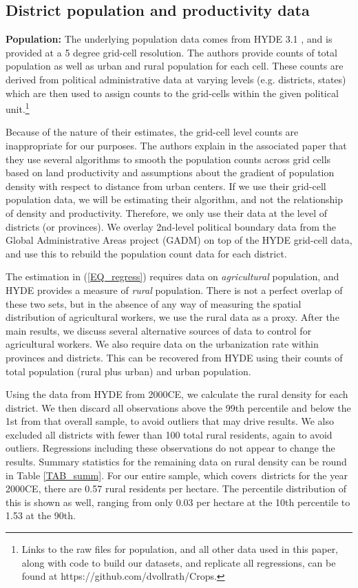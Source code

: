 \documentclass[11pt]{article}
\begin{document}
\subsection{District population and productivity data}

\noindent\textbf{Population:} The underlying population data comes from HYDE 3.1 \citep{hyde31}, and is provided at a 5 degree grid-cell resolution. The authors provide counts of total population as well as urban and rural population for each cell. These counts are derived from political administrative data at varying levels (e.g. districts, states) which are then used to assign counts to the grid-cells within the given political unit.\footnote{Links to the raw files for population, and all other data used in this paper, along with code to build our datasets, and replicate all regressions, can be found at https://github.com/dvollrath/Crops.}

Because of the nature of their estimates, the grid-cell level counts are inappropriate for our purposes. The authors explain in the associated paper that they use several algorithms to smooth the population counts across grid cells based on land productivity and assumptions about the gradient of population density with respect to distance from urban centers. If we use their grid-cell population data, we will be estimating their algorithm, and not the relationship of density and productivity. Therefore, we only use their data at the level of districts (or provinces). We overlay 2nd-level political boundary data from the Global Administrative Areas project (GADM) on top of the HYDE grid-cell data, and use this to rebuild the population count data for each district.

The estimation in (\ref{EQ_regress}) requires data on \textit{agricultural} population, and HYDE provides a measure of \textit{rural} population. There is not a perfect overlap of these two sets, but in the absence of any way of measuring the spatial distribution of agricultural workers, we use the rural data as a proxy. After the main results, we discuss several alternative sources of data to control for agricultural workers. We also require data on the urbanization rate within provinces and districts. This can be recovered from HYDE using their counts of total population (rural plus urban) and urban population.

Using the data from HYDE from 2000CE, we calculate the rural density for each district. We then discard all observations above the 99th percentile and below the 1st from that overall sample, to avoid outliers that may drive results. We also excluded all districts with fewer than 100 total rural residents, again to avoid outliers. Regressions including these observations do not appear to change the results. Summary statistics for the remaining data on rural density can be round in Table \ref{TAB_summ}. For our entire sample, which covers\districts \ districts for the year 2000CE, there are 0.57 rural residents per hectare. The percentile distribution of this is shown as well, ranging from only 0.03 per hectare at the 10th percentile to 1.53 at the 90th. 
\end{document}
